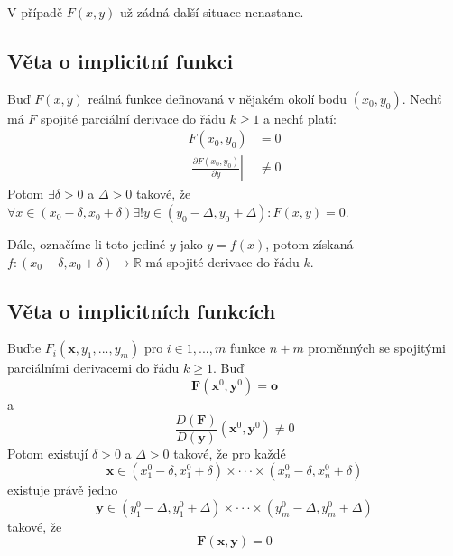 \documentclass[../main.tex]{subfiles}
\begin{document}
\noindent
\hspace{1.2mm}
V případě $F(x,y)$ už zádná další situace nenastane.

\subsection{Věta o implicitní funkci}
\hspace{1.2mm}
\noindent
Buď $F(x,y)$ reálná funkce definovaná v nějakém okolí bodu $(x_0, y_0)$. Nechť má $F$ spojité parciální
derivace do řádu $k \geq 1$ a nechť platí:
\begin{align*}
    F(x_0, y_0) &= 0\\
    \left| \frac{\partial F(x_0,y_0)}{\partial y} \right| &\neq 0
\end{align*}
Potom $ \exists \delta > 0$ a $\Delta > 0$ takové, že
$\forall x \in (x_0 - \delta , x_0 + \delta) \exists! y \in (y_0 - \Delta , y_0 + \Delta): F(x,y) = 0$.

\noindent
Dále, označíme-li toto jediné $y$ jako $y = f(x)$, potom získaná
$f: (x_0 - \delta , x_0 + \delta ) \to \mathbb{R}$ má spojité derivace do řádu $k$.


\subsection{Věta o implicitních funkcích}
\hspace{1.2mm}
\noindent
Buďte $F_i(\mathbf{x}, y_1, ... , y_m)$ pro $i \in {1, ... , m}$ funkce $n+m$ proměnných se spojitými
parciálními derivacemi do řádu $k \geq 1$. Buď \[ \mathbf{F}(\mathbf{x}^0, \mathbf{y}^0) = \mathbf{o} \]
a \[ \frac{D(\mathbf{F})}{D(\mathbf{y})}(\mathbf{x}^0, \mathbf{y}^0) \neq 0 \]
Potom existují $\delta > 0$ a $\Delta > 0$ takové, že pro každé
\[ \mathbf{x} \in (x_{1}^{0} - \delta, x_{1}^{0} + \delta) \times \cdot \cdot \cdot \times 
(x_{n}^{0} - \delta, x_{n}^{0} + \delta)\]
existuje právě jedno
\[ \mathbf{y} \in (y_{1}^{0} - \Delta , y_{1}^{0} + \Delta) \times \cdot \cdot \cdot \times
(y_{m}^{0} - \Delta , y_{m}^{0} + \Delta) \]
takové, že
\[ \mathbf{F}(\mathbf{x}, \mathbf{y}) = 0 \]
\end{document}
